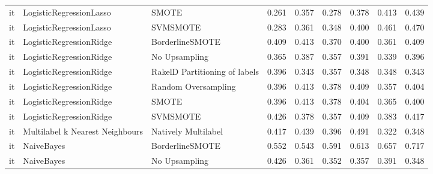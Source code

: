 \begin{tabular}{lllllllll}
      it &         LogisticRegressionLasso &                         SMOTE & 0.261 &                     0.357 &                 0.278 &                  0.378 &                                   0.413 &     0.439 \\
      it &         LogisticRegressionLasso &                      SVMSMOTE & 0.283 &                     0.361 &                 0.348 &                  0.400 &                                   0.461 &     0.470 \\
      it &         LogisticRegressionRidge &               BorderlineSMOTE & 0.409 &                     0.413 &                 0.370 &                  0.400 &                                   0.361 &     0.409 \\
      it &         LogisticRegressionRidge &                 No Upsampling & 0.365 &                     0.387 &                 0.357 &                  0.391 &                                   0.339 &     0.396 \\
      it &         LogisticRegressionRidge & RakelD Partitioning of labels & 0.396 &                     0.343 &                 0.357 &                  0.348 &                                   0.348 &     0.343 \\
      it &         LogisticRegressionRidge &           Random Oversampling & 0.396 &                     0.413 &                 0.378 &                  0.409 &                                   0.357 &     0.404 \\
      it &         LogisticRegressionRidge &                         SMOTE & 0.396 &                     0.413 &                 0.378 &                  0.404 &                                   0.365 &     0.400 \\
      it &         LogisticRegressionRidge &                      SVMSMOTE & 0.426 &                     0.378 &                 0.357 &                  0.409 &                                   0.383 &     0.417 \\
      it & Multilabel k Nearest Neighbours &           Natively Multilabel & 0.417 &                     0.439 &                 0.396 &                  0.491 &                                   0.322 &     0.348 \\
      it &                      NaiveBayes &               BorderlineSMOTE & 0.552 &                     0.543 &                 0.591 &                  0.613 &                                   0.657 &     0.717 \\
      it &                      NaiveBayes &                 No Upsampling & 0.426 &                     0.361 &                 0.352 &                  0.357 &                                   0.391 &     0.348 \\

\end{tabular}
